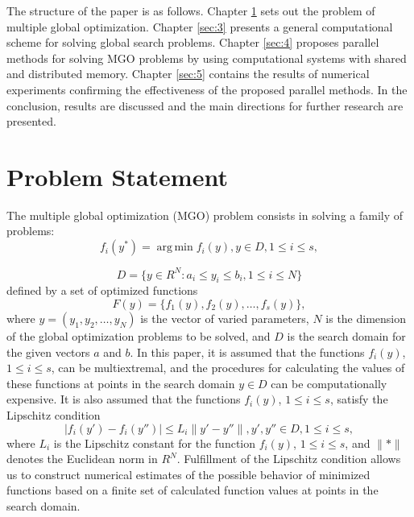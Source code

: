 \documentclass[review]{elsarticle}
\DeclareMathOperator*{\argmin}{arg\,min}
\begin{document}
The structure of the paper is as follows. Chapter \ref{sec:2} sets out the problem of multiple global optimization. Chapter \ref{sec:3} presents a general computational scheme for solving global search problems. Chapter \ref{sec:4} proposes parallel methods for solving MGO problems by using computational systems with shared and distributed memory. Chapter \ref{sec:5} contains the results of numerical experiments confirming the effectiveness of the proposed parallel methods. In the conclusion, results are discussed and the main directions for further research are presented.

\section{Problem Statement}\label{sec:2}

The multiple global optimization (MGO) problem consists in solving a family of problems:
\begin{equation}\label{eq:1}
f_i(y^*) = \argmin f_i(y), y \in D, 1 \leq i \leq s,
\end{equation}

\begin{equation}\label{eq:2}
D  = \{ y\in R^N: a_i \leq y_i \leq b_i, 1 \leq i \leq N \}
\end{equation}
defined by a set of optimized functions
\begin{equation}\label{eq:3}
F(y) = \{ f_1(y),  f_2(y),\dots, f_s(y) \},
\end{equation}
where $y = (y_1,y_2,\dots,y_N)$ is the vector of varied parameters, $N$ is the dimension of the global optimization problems to be solved, and $D$ is the search domain for the given vectors $a$ and $b$. 
In this paper, it is assumed that the functions $f_i(y)$, $1 \leq i \leq s$, can be multiextremal, and the procedures for calculating the values of these functions at points in the search domain $y \in D$ can be computationally expensive. It is also assumed that the functions $f_i(y)$, $1 \leq i \leq s$, satisfy the Lipschitz condition
\begin{equation}\label{eq:4}
|f_i (y')-f_i (y'')| \leq L_i \|y'-y''\|, y',y''\in D, 1 \leq i \leq s,
\end{equation}
where $L_i$ is the Lipschitz constant for the function $f_i(y)$, $1 \leq i \leq s$, and ${\|*\|}$ denotes the Euclidean norm in $R^N$. Fulfillment of the Lipschitz condition allows us to construct numerical estimates of the possible behavior of minimized functions based on a finite set of calculated function values at points in the search domain.
\end{document}
